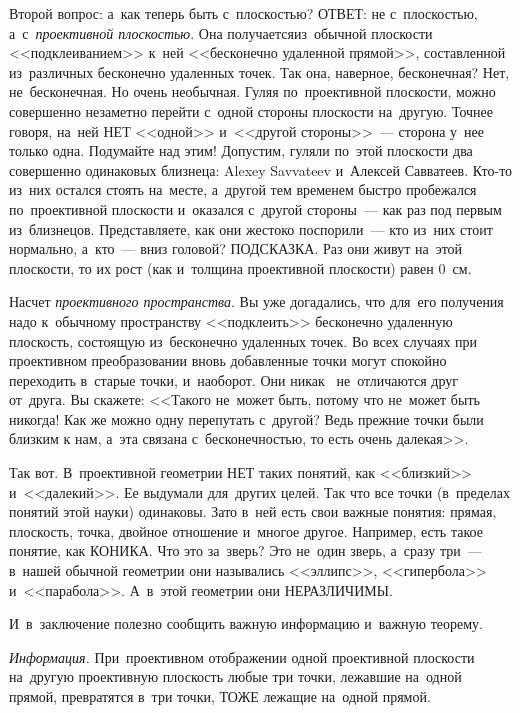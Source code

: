 Второй вопрос: а~как теперь быть с~плоскостью? ОТВЕТ: не с~плоскостью, а~с~\textit{проективной плоскостью}.
Она получается\linebreak из~обычной плоскости <<подклеиванием>> к~ней <<бесконечно удаленной прямой>>,
составленной из~различных бесконечно удаленных точек. Так она, наверное, бесконечная? Нет,
не~бесконечная. Но очень необычная. Гуляя по~проективной плоскости, можно совершенно незаметно
перейти с~одной стороны плоскости на~другую. Точнее говоря, на~ней НЕТ <<одной>> и~<<другой
стороны>>~--- сторона у~нее только одна. Подумайте над этим! Допустим, гуляли по~этой плоскости два
совершенно одинаковых близнеца: Alexey Savvateev и~Алексей Савватеев. Кто-то из~них остался стоять
на~месте, а~другой тем временем быстро пробежался по~проективной плоскости и~оказался с~другой
стороны~--- как раз под первым из~близнецов. Представляете, как они жестоко поспорили~--- кто
из~них стоит нормально, а~кто~--- вниз головой? ПОДСКАЗКА. Раз они живут на~этой плоскости, то их
рост (как и~толщина проективной плоскости) равен 0~см.


Насчет \textit{проективного пространства}. Вы уже догадались, что для~его получения надо к~обычному
пространству <<подклеить>> бесконечно удаленную плоскость, состоящую из~бесконечно уда\-лен\-ных точек.
Во всех случаях при проективном преобразовании вновь добавленные точки могут
спокойно переходить в~старые точки, и~наоборот. Они никак ~не~отличаются друг
от~друга. Вы скажете: <<Такого не~может быть, потому что не~может быть никогда! Как же можно одну перепутать
с~другой? Ведь прежние точки были близким к нам, а~эта связана с~бесконечностью, то есть очень далекая>>.

Так вот. В~проективной геометрии НЕТ таких понятий, как <<близкий>> и~<<далекий>>. Ее выдумали
для~других целей. Так что все точки (в~пределах понятий этой науки) одинаковы. Зато в~ней есть свои
важные понятия: прямая, плоскость, точка, двойное отношение и~многое другое.
 Например, есть такое понятие, как КОНИКА. Что это за~зверь? Это не~один зверь, а~сразу
три~--- в~нашей обычной геометрии они назывались <<эллипс>>, <<гипербола>> и~<<парабола>>. А~в~этой
геометрии они НЕРАЗЛИЧИМЫ.

И~в~заключение полезно сообщить важную информацию и~важную теорему.

\textit{Информация.} При~проективном отображении одной проективной плоскости на~другую проективную
плоскость любые три точки, лежавшие на~одной прямой, превратятся в~три точки, ТОЖЕ лежащие на~одной
прямой.

